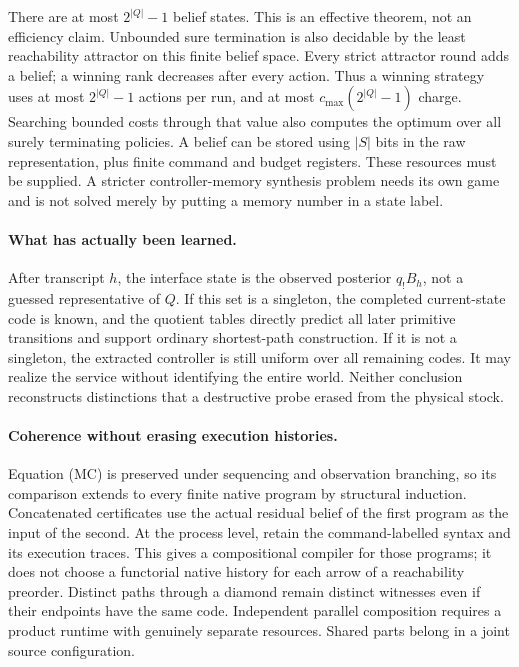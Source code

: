 \documentclass[11pt]{article}
\theoremstyle{definition}
\theoremstyle{remark}
\begin{document}
There are at most $2^{|Q|}-1$ belief states. This is an effective theorem,
not an efficiency claim. Unbounded sure termination is also decidable by
the least reachability attractor on this finite belief space. Every strict
attractor round adds a belief; a winning rank decreases after every action.
Thus a winning strategy uses at most $2^{|Q|}-1$ actions per run, and at
most $c_{\max}(2^{|Q|}-1)$ charge. Searching bounded costs through that value
also computes the optimum over all surely terminating policies. A belief can be stored using $|S|$ bits in the raw representation, plus
finite command and budget registers. These resources must be supplied.
A stricter controller-memory synthesis problem needs its own game and
is not solved merely by putting a memory number in a state label.

\paragraph{What has actually been learned.}
After transcript $h$, the interface state is the observed posterior
$q_!B_h$, not a guessed representative of $Q$. If this set is a singleton,
the completed current-state code is known, and the quotient tables directly
predict all later primitive transitions and support ordinary shortest-path
construction. If it is not a singleton, the extracted controller is still
uniform over all remaining codes. It may realize the service without
identifying the entire world. Neither conclusion reconstructs distinctions
that a destructive probe erased from the physical stock.

\paragraph{Coherence without erasing execution histories.}
Equation (MC) is preserved under sequencing and observation branching, so
its comparison extends to every finite native program by structural
induction. Concatenated certificates use the actual residual belief of the
first program as the input of the second. At the process level, retain the
command-labelled syntax and its execution traces. This gives a compositional
compiler for those programs; it does not choose a functorial native history
for each arrow of a reachability preorder. Distinct paths through a diamond
remain distinct witnesses even if their endpoints have the same code.
Independent parallel composition requires a product runtime with genuinely
separate resources. Shared parts belong in a joint source configuration.
\end{document}
